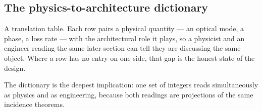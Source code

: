 \documentclass[11pt]{article}
\begin{document}
\subsection{The physics-to-architecture dictionary}

\begin{plainbox}
A translation table. Each row pairs a physical quantity --- an optical mode, a
phase, a loss rate --- with the architectural role it plays, so a physicist and an engineer
reading the same later section can tell they are discussing the same object. Where a row
has no entry on one side, that gap is the honest state of the design.
\end{plainbox}


The dictionary is the deepest implication: one set of integers reads
simultaneously as physics and as engineering, because both readings
are projections of the same incidence theorems.
\end{document}
